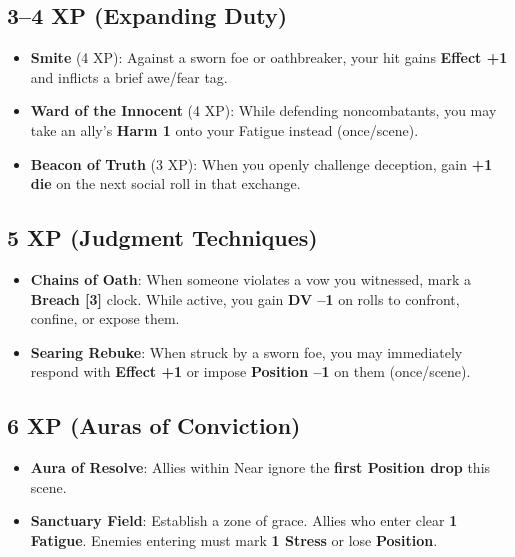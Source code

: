 \documentclass[11pt]{book}
\begin{document}
\subsection*{3--4 XP (Expanding Duty)}
\begin{itemize}
  \item \textbf{Smite} (4 XP): Against a sworn foe or oathbreaker, your hit gains
    \textbf{Effect +1} and inflicts a brief awe/fear tag.
  \item \textbf{Ward of the Innocent} (4 XP): While defending noncombatants, you may take
    an ally's \textbf{Harm 1} onto your Fatigue instead (once/scene).
  \item \textbf{Beacon of Truth} (3 XP): When you openly challenge deception, gain
    \textbf{+1 die} on the next social roll in that exchange.
\end{itemize}

\subsection*{5 XP (Judgment Techniques)}
\begin{itemize}
  \item \textbf{Chains of Oath}: When someone violates a vow you witnessed, mark a
    \textbf{Breach [3]} clock. While active, you gain \textbf{DV --1} on rolls to confront,
    confine, or expose them.
  \item \textbf{Searing Rebuke}: When struck by a sworn foe, you may immediately respond
    with \textbf{Effect +1} or impose \textbf{Position --1} on them (once/scene).
\end{itemize}

\subsection*{6 XP (Auras of Conviction)}
\begin{itemize}
  \item \textbf{Aura of Resolve}: Allies within Near ignore the \textbf{first Position drop}
    this scene.
  \item \textbf{Sanctuary Field}: Establish a zone of grace. Allies who enter clear
    \textbf{1 Fatigue}. Enemies entering must mark \textbf{1 Stress} or lose \textbf{Position}.
\end{itemize}
\end{document}
